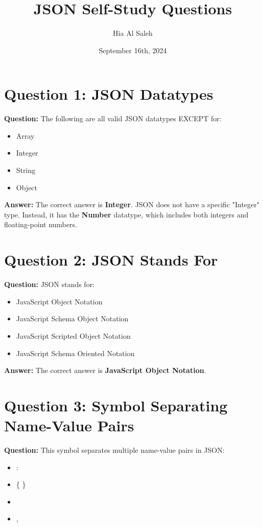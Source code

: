 \documentclass{article}
\title{JSON Self-Study Questions}
\author{Hia Al Saleh}
\date{September 16th, 2024}
\begin{document}
\maketitle

\section*{Question 1: JSON Datatypes}

\textbf{Question:} The following are all valid JSON datatypes EXCEPT for:

\begin{itemize}
  \item Array
  \item Integer
  \item String
  \item Object
\end{itemize}

\textbf{Answer:} The correct answer is \textbf{Integer}. JSON does not have a specific "Integer" type. Instead, it has the \textbf{Number} datatype, which includes both integers and floating-point numbers.

\section*{Question 2: JSON Stands For}

\textbf{Question:} JSON stands for:
\begin{itemize}
  \item JavaScript Object Notation
  \item JavaScript Schema Object Notation
  \item JavaScript Scripted Object Notation
  \item JavaScript Schema Oriented Notation
\end{itemize}

\textbf{Answer:} The correct answer is \textbf{JavaScript Object Notation}.

\section*{Question 3: Symbol Separating Name-Value Pairs}

\textbf{Question:} This symbol separates multiple name-value pairs in JSON:
\begin{itemize}
  \item :
  \item \{ \}
  \item [ ]
  \item ,
\end{itemize}
\end{document}
